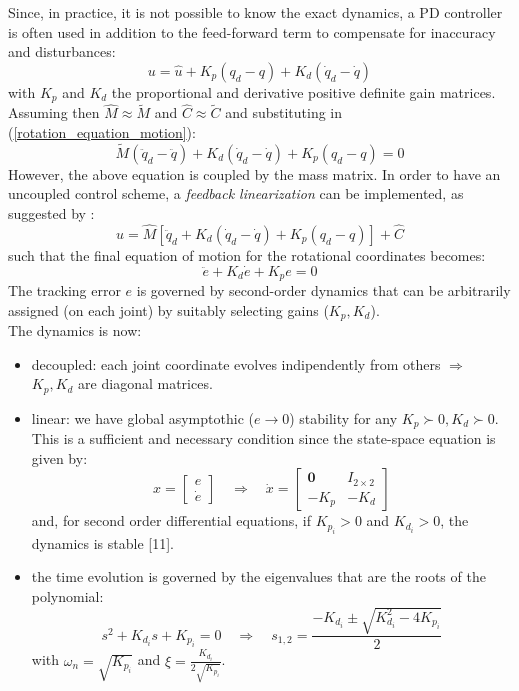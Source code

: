 \documentclass[a4paper,12pt,oneside]{report}
\begin{document}
Since, in practice, it is not possible to know the exact dynamics, a PD controller is often used in addition to the feed-forward term to compensate for inaccuracy and disturbances:
\begin{equation}
  u=\hat{u}+K_p(q_d-q)+K_d(\dot{q}_d-\dot{q})
\end{equation}
with $K_p$ and $K_d$ the proportional and derivative positive definite gain matrices.\\
Assuming then $\hat{M}\approx\tilde{M}$ and $\hat{C}\approx\tilde{C}$ and substituting in (\ref{rotation_equation_motion}):
\begin{equation}
  \tilde{M}(\ddot{q}_d-\ddot{q})+K_d(\dot{q}_d-\dot{q})+K_p(q_d-q)=0
\end{equation}
However, the above equation is coupled by the mass matrix. In order to have an uncoupled control scheme, a \textit{feedback linearization} can be implemented, as suggested by \cite{sixteen}:
\begin{equation}
  u=\hat{M}[\ddot{q}_d+K_d(\dot{q}_d-\dot{q})+K_p(q_d-q)]+\hat{C}
  \label{feedback_linearization}
\end{equation}
such that the final equation of motion for the rotational coordinates becomes:
\begin{equation}
  \ddot{e}+K_d\dot{e}+K_pe=0
  \label{controlled_dynamics}
\end{equation}
The tracking error $e$ is governed by second-order dynamics that can be arbitrarily assigned (on each joint) by suitably selecting gains ($K_p,K_d$).\\
The dynamics is now:
\begin{itemize}
  \item decoupled: each joint coordinate evolves indipendently from others $\Rightarrow$ $K_p,K_d$ are diagonal matrices.
  \item linear: we have global asymptothic ($e\rightarrow 0$) stability for any $K_p\succ 0,K_d\succ 0$. This is a sufficient and necessary condition since the state-space equation is given by:
    \begin{equation}
      x=\begin{bmatrix}
        e\\\dot{e}
      \end{bmatrix}\quad \Rightarrow \quad \dot{x}=\begin{bmatrix}
        \mathbf{0}&I_{2\times 2}\\
        -K_p&-K_d
      \end{bmatrix}
    \end{equation}
    and, for second order differential equations, if $K_{p_i}>0$ and $K_{d_i}>0$, the dynamics is stable [11].
  \item the time evolution is governed by the eigenvalues that are the roots of the polynomial:
    \begin{equation}
      s^2+K_{d_i}s+K_{p_i}=0 \quad \Rightarrow \quad s_{1,2}=\frac{-K_{d_i}\pm \sqrt{K_{d_i}^2-4K_{p_i}}}{2}
    \end{equation}
    with $\omega_n=\sqrt{K_{p_i}}$ and $\xi=\frac{K_{d_i}}{2\sqrt{K_{p_i}}}$.
\end{itemize}
\end{document}
